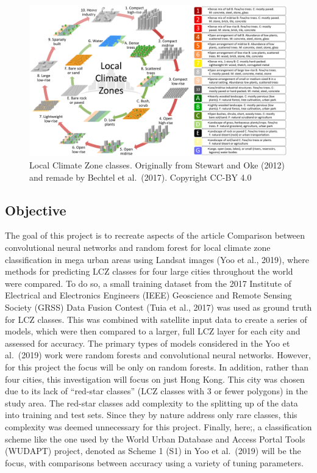 \documentclass[
]{article}
\begin{document}
\begin{figure}
\centering
\includegraphics{figure_from_Bechtel_et_al_Stewart_Oke_cc-by4.png}
\caption{Local Climate Zone classes. Originally from Stewart and Oke
(2012) and remade by Bechtel et al.~(2017). Copyright CC-BY 4.0}
\end{figure}

\hypertarget{objective}{%
\subsection{Objective}\label{objective}}

The goal of this project is to recreate aspects of the article
Comparison between convolutional neural networks and random forest for
local climate zone classification in mega urban areas using Landsat
images (Yoo et al., 2019), where methods for predicting LCZ classes for
four large cities throughout the world were compared. To do so, a small
training dataset from the 2017 Institute of Electrical and Electronics
Engineers (IEEE) Geoscience and Remote Sensing Society (GRSS) Data
Fusion Contest (Tuia et al., 2017) was used as ground truth for LCZ
classes. This was combined with satellite input data to create a series
of models, which were then compared to a larger, full LCZ layer for each
city and assessed for accuracy. The primary types of models considered
in the Yoo et al.~(2019) work were random forests and convolutional
neural networks. However, for this project the focus will be only on
random forests. In addition, rather than four cities, this investigation
will focus on just Hong Kong. This city was chosen due to its lack of
``red-star classes'' (LCZ classes with 3 or fewer polygons) in the study
area. The red-star classes add complexity to the splitting up of the
data into training and test sets. Since they by nature address only rare
classes, this complexity was deemed unnecessary for this project.
Finally, here;, a classification scheme like the one used by the World
Urban Database and Access Portal Tools (WUDAPT) project, denoted as
Scheme 1 (S1) in Yoo et al.~(2019) will be the focus, with comparisons
between accuracy using a variety of tuning parameters.
\end{document}
